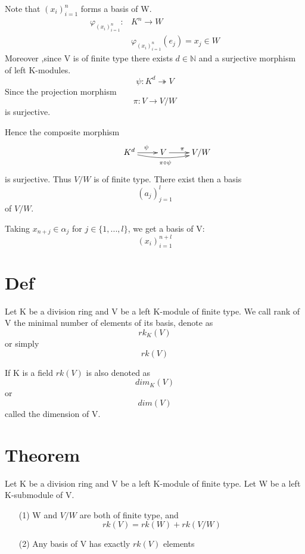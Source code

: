 \documentclass{book}
\begin{document}
Note that $(x_i)_{i=1}^n$ forms a basis of W. $$\begin{aligned}
\varphi_(x_i)_{i=1}^n:&K^{n}\rightarrow W\\ &\varphi_(x_i)_{i=1}^n(e_j)=x_j\in W
\end{aligned}$$
Moreover ,since V is of finite type there exists $d\in \mathbb{N}$ and a surjective morphism of left K-modules.$$\psi:K^d\twoheadrightarrow V$$Since the projection morphism $$\pi:V\rightarrow V/W$$ is surjective.

Hence the composite morphism
$$
\xymatrix{
    & K^d \ar[r]^\psi\ar@/_/[rr]_{\pi\circ\psi} & V \ar[r]^\pi & V/W
}
$$
is surjective. Thus $V/W$ is of finite type. There exist then a basis $$(a_j)_{j=1}^l$$ of $V/W$.

Taking $x_{n+j}\in \alpha_j$ for $j\in \{1,...,l\}$, we get a basis of V:$$(x_i)_{i=1}^{n+l}$$
\section{Def}
Let K be a division ring and V be a left K-module of finite type. We call rank of V the minimal number of elements of its basis, denote as $$rk_{K}(V)$$ or simply $$rk(V)$$

If K is a field $rk(V)$ is also denoted as $$dim_K(V)$$or$$dim(V)$$ called the dimension of V.
\section{Theorem}
Let K be a division ring and V be a left K-module of finite type. Let W be a left K-submodule of V.
\begin{itemize}
    \item [(1)]W and $V/W$ are both of finite type, and $$rk(V)=rk(W)+rk(V/W)$$
    \item [(2)]Any basis of V has exactly $rk(V)$ elements
\end{itemize}
\end{document}
